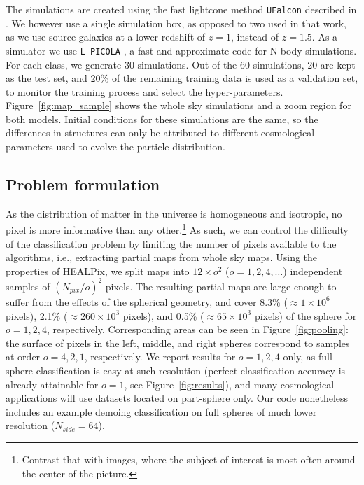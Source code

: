 \documentclass[final,twocolumn,3p,times,sort&compress]{elsarticle}
\newcommand{\figref}[1]{Figure~\ref{fig:#1}}
\newcommand{\1}{\b{1}}              %
\newcommand{\0}{\b{0}}              %
\newcommand{\pkg}[1]{\texttt{#1}}
\begin{document}
The simulations are created using the fast lightcone method \pkg{UFalcon} described in \citep{sgier2018fastgeneration}.
We however use a single simulation box, as opposed to two used in that work, as we use source galaxies at a lower redshift of $z=1$, instead of $z=1.5$.
As a simulator we use \pkg{L-PICOLA} \citep{howlett2015lpicola}, a fast and approximate code for N-body simulations.
For each class, we generate $30$ simulations.
Out of the $60$ simulations, $20$ are kept as the test set, and $20\%$ of the remaining training data is used as a validation set, to monitor the training process and select the hyper-parameters.
\figref{map_sample} shows the whole sky simulations and a zoom region for both models.
Initial conditions for these simulations are the same, so the differences in structures can only be attributed to different cosmological parameters used to evolve the particle distribution.

\subsection{Problem formulation}

As the distribution of matter in the universe is homogeneous and isotropic, no pixel is more informative than any other.\footnote{Contrast that with images, where the subject of interest is most often around the center of the picture.}
As such, we can control the difficulty of the classification problem by limiting the number of pixels available to the algorithms, i.e., extracting partial maps from whole sky maps.
Using the properties of HEALPix, we split maps into $12 \times o^2$ ($o=1,2,4,\dots$) independent samples of $(N_{pix} / o)^2$ pixels. The resulting partial maps are large enough to suffer from the effects of the spherical geometry, and cover 8.3\% ($\approx 1 \times 10^6$ pixels), 2.1\% ($\approx 260 \times 10^3$ pixels), and 0.5\% ($\approx 65 \times 10^3$ pixels) of the sphere for $o=1,2,4$, respectively.
Corresponding areas can be seen in \figref{pooling}: the surface of pixels in the left, middle, and right spheres correspond to samples at order $o=4,2,1$, respectively.
We report results for $o=1,2,4$ only, as full sphere classification is easy at such resolution (perfect classification accuracy is already attainable for $o=1$, see \figref{results}), and many cosmological applications will use datasets located on part-sphere only. Our code nonetheless includes an example demoing classification on full spheres of much lower resolution ($N_{side} = 64$).
\end{document}

